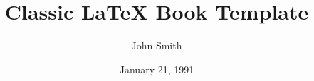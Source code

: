 \documentclass[a4paper,11pt]{book}
\begin{document}
\title{\textbf{Classic LaTeX Book Template}}
\author{John Smith}
\date{January 21, 1991}


\maketitle






\tableofcontents



\pagestyle{fancy}







\nocite{*}



\end{document}
